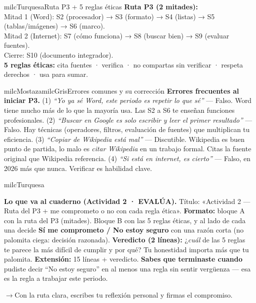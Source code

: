 \documentclass[11pt,letterpaper]{article}
\newcommand{\puente}[1]{%
  \begin{puentebox}%
    \textcolor{milcGradeDark}{$\rightarrow$}\hspace{2mm}#1%
  \end{puentebox}%
}
\begin{document}
\begin{drawbox}{milcTurquesa}{Ruta P3 + 5 reglas éticas}
\textbf{Ruta P3 (2 mitades):} \\[1mm]
Mitad 1 (Word): S2 (procesador) → S3 (formato) → S4 (listas) → S5 (tablas/imágenes) → S6 (marco). \\[1mm]
Mitad 2 (Internet): S7 (cómo funciona) → S8 (buscar bien) → S9 (evaluar fuentes). \\[1mm]
Cierre: S10 (documento integrador). \\[1mm]
\textbf{5 reglas éticas:} cita fuentes · verifica · no compartas sin verificar · respeta derechos · usa para sumar.
\end{drawbox}

\begin{softbox}{milcMostaza}{milcGris}{Errores comunes y su corrección}
\textbf{Errores frecuentes al iniciar P3.} (1) \emph{``Yo ya sé Word, este periodo es repetir lo que sé''} --- Falso. Word tiene mucho más de lo que la mayoría usa. Las S2 a S6 te enseñan funciones profesionales. (2) \emph{``Buscar en Google es solo escribir y leer el primer resultado''} --- Falso. Hay técnicas (operadores, filtros, evaluación de fuentes) que multiplican tu eficiencia. (3) \emph{``Copiar de Wikipedia está mal''} --- Discutible. Wikipedia es buen punto de partida, lo malo es \emph{citar Wikipedia} en un trabajo formal. Citas la fuente original que Wikipedia referencia. (4) \emph{``Si está en internet, es cierto''} --- Falso, en 2026 más que nunca. Verificar es habilidad clave.
\end{softbox}

\begin{infoband}{milcTurquesa}


\textbf{Lo que va al cuaderno (Actividad 2 · EVALÚA).} Título: «Actividad 2 --- Ruta del P3 + me comprometo o no con cada regla ética». \textbf{Formato:} bloque A con la ruta del P3 (mitades). Bloque B con las 5 reglas éticas, y al lado de cada una decide \textbf{Sí me comprometo / No estoy seguro} con una razón corta (no palomita ciega: decisión razonada). \textbf{Veredicto (2 líneas):} ¿\emph{cuál} de las 5 reglas te parece la más difícil de cumplir y por qué? Tu honestidad importa más que tu palomita. \textbf{Extensión:} 15 líneas + veredicto. \textbf{Sabes que terminaste cuando} pudiste decir ``No estoy seguro'' en al menos una regla sin sentir vergüenza --- esa es la regla a trabajar este periodo.
\end{infoband}

\puente{Con la ruta clara, escribes tu reflexión personal y firmas el compromiso.}
\end{document}
